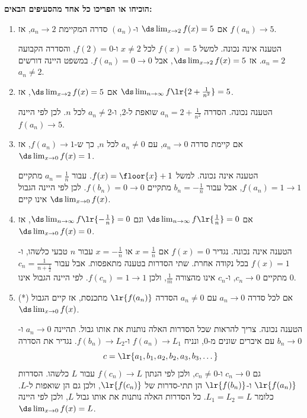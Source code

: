 \textbf{הוכיחו או הפריכו כל אחד מהסעיפים הבאים:}
\begin{enumerate}
\item אם $\ds\lim_{x\to2}f(x)=5$ ו-$(a_n)$ סדרה המקיימת $a_n\to2$, אז $f(a_n)\to5$.
\ifsol
{}
\begin{solbox}
הטענה אינה נכונה. למשל $f(x)=5$ לכל $x\ne2$ ו-$f(2)=0$, והסדרה הקבועה $a_n=2$. אז $\ds\lim_{x\to2}f(x)=5$, אבל $f(a_n)=0\to0$. במשפט היינה דורשים $a_n\ne2$.
\end{solbox}
\fi
\item אם $\ds\lim_{x\to2}f(x)=5$, אז $\ds\lim_{n\to\infty}f\lr{2+\frac1{n^2}}=5$.
\ifsol
\begin{solbox}
הטענה נכונה. הסדרה $a_n=2+\frac1{n^2}$ שואפת ל-$2$, ו-$a_n\ne2$ לכל $n$. לכן לפי היינה $f(a_n)\to5$.
\end{solbox}
\fi
\item אם קיימת סדרה $a_n\to0$, עם $a_n\ne0$ לכל $n$, כך ש-$f(a_n)\to1$, אז $\ds\lim_{x\to0}f(x)=1$.
\ifsol
\begin{solbox}
הטענה אינה נכונה. למשל $f(x)=\floor{x}+1$. עבור $a_n=\frac1n$ מתקיים $f(a_n)=1\to1$, אבל עבור $b_n=-\frac1n$ מתקיים $f(b_n)=0\to0$. לכן לפי היינה הגבול $\ds\lim_{x\to0}f(x)$ אינו קיים.
\end{solbox}
\fi
\item אם $\ds\lim_{n\to\infty}f\lr{\frac1n}=0$ וגם $\ds\lim_{n\to\infty}f\lr{-\frac1n}=0$, אז $\ds\lim_{x\to0}f(x)=0$.
\ifsol
{}
\begin{solbox}
הטענה אינה נכונה. נגדיר $f(x)=0$ אם $x=\frac1n$ או $x=-\frac1n$ עבור $n$ טבעי כלשהו, ו-$f(x)=1$ בכל נקודה אחרת. שתי הסדרות בטענה מתאפסות. אבל עבור $c_n=\frac{1}{n+\frac12}$ מתקיים $c_n\to0$, ו-$c_n$ אינו מהצורה $\frac1m$, ולכן $f(c_n)=1\to1$. לפי היינה הגבול אינו $0$.
\end{solbox}
\fi
\item (*) אם לכל סדרה $a_n\to0$ עם $a_n\ne0$ הסדרה $\lr{f(a_n)}$ מתכנסת, אז קיים הגבול $\ds\lim_{x\to0}f(x)$.
\ifsol
{}
\begin{solbox}
הטענה נכונה. צריך להראות שכל הסדרות האלה נותנות את אותו גבול. תהיינה $a_n\to0$ ו-$b_n\to0$ עם איברים שונים מ-$0$, ונניח $f(a_n)\to L_1$ ו-$f(b_n)\to L_2$. נגדיר את הסדרה
\[c=\lr{a_1,b_1,a_2,b_2,a_3,b_3,\dots}\]
גם $c_n\to0$ ו-$c_n\ne0$, ולכן לפי הנתון $f(c_n)\to L$ עבור $L$ כלשהו. הסדרות $\lr{f(a_n)}$ ו-$\lr{f(b_n)}$ הן תתי-סדרות של $\lr{f(c_n)}$, ולכן גם הן שואפות ל-$L$. כלומר $L_1=L_2=L$. כל הסדרות האלה נותנות את אותו גבול $L$, ולכן לפי היינה $\ds\lim_{x\to0}f(x)=L$.
\end{solbox}
\fi
\end{enumerate}
